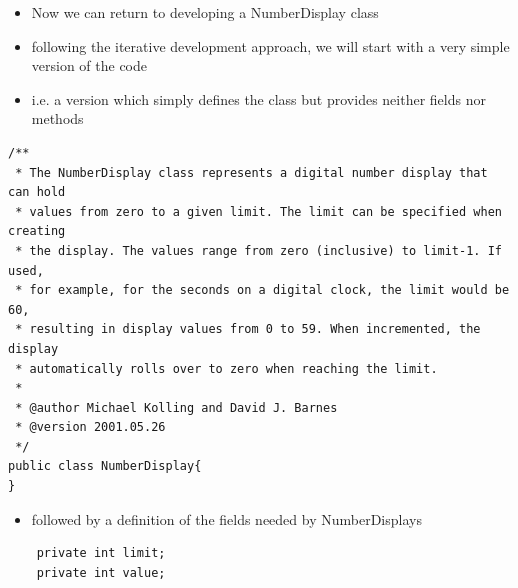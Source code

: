 \documentclass{beamer}
\begin{document}
\begin{frame}[fragile]
\begin{itemize}
\item Now we can return to developing a NumberDisplay class
\item following the iterative development approach, we will start with a very simple version of the code
\item i.e. a version which simply defines the class but provides neither fields nor methods
\end{itemize}
\tiny
\begin{block}{}
\begin{lstlisting}
/**
 * The NumberDisplay class represents a digital number display that can hold
 * values from zero to a given limit. The limit can be specified when creating
 * the display. The values range from zero (inclusive) to limit-1. If used,
 * for example, for the seconds on a digital clock, the limit would be 60, 
 * resulting in display values from 0 to 59. When incremented, the display 
 * automatically rolls over to zero when reaching the limit.
 * 
 * @author Michael Kolling and David J. Barnes
 * @version 2001.05.26
 */
public class NumberDisplay{
}
\end{lstlisting}
\end{block}

\end{frame}

\begin{frame}[fragile]

\begin{itemize}
\item followed by a definition of the fields needed by NumberDisplays
\end{itemize}

\begin{block}{}
\begin{lstlisting}
    private int limit;
    private int value;
\end{lstlisting}
\end{block}

\end{frame}
\end{document}
